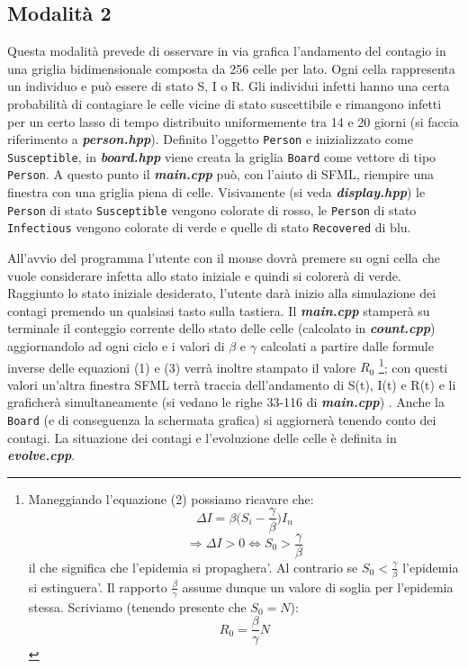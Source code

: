 \documentclass[a4paper,10 pt]{article}
\begin{document}
\subsection{Modalità 2}
Questa modalità prevede di osservare in via grafica l'andamento del contagio in una griglia bidimensionale composta da 256 celle per lato. Ogni cella rappresenta un individuo e può essere di stato S, I o R. Gli individui infetti hanno una certa probabilità di contagiare le celle vicine di stato suscettibile e rimangono infetti per un certo lasso di tempo distribuito uniformemente tra 14 e 20 giorni (si faccia riferimento a \textbf{\textit{person.hpp}}). Definito l'oggetto \verb!Person! e inizializzato come \verb!Susceptible!, in \textbf{\textit{board.hpp}} viene creata la griglia \verb!Board! come vettore di tipo  \verb!Person!. A questo punto il \textbf{\textit{main.cpp}} può, con l'aiuto di SFML, riempire una finestra con una griglia piena di celle. Visivamente (si veda  \textbf{\textit{display.hpp}}) le \verb!Person! di stato \verb!Susceptible! vengono colorate di rosso, le \verb!Person! di stato \verb!Infectious! vengono colorate di verde e quelle di stato \verb!Recovered! di blu.

All'avvio del programma l'utente con il mouse dovrà premere su ogni cella che vuole considerare infetta allo stato iniziale e quindi si colorerà di verde. Raggiunto lo stato iniziale desiderato, l'utente darà inizio alla simulazione dei contagi premendo un qualsiasi tasto sulla tastiera. Il \textbf{\textit{main.cpp}} stamperà su terminale il conteggio corrente dello stato delle celle (calcolato in \textbf{\textit{count.cpp}}) aggiornandolo ad ogni ciclo e i valori di $\beta$ e $\gamma$ calcolati a partire dalle formule inverse delle equazioni (1) e (3) verrà inoltre stampato il valore $R_0$ 
\footnote{
  Maneggiando l'equazione (2) possiamo ricavare che:
  $$
    \Delta I = \beta \big( S_i - \frac{\gamma}{\beta} \big) I_n
  $$
  $$
    \Rightarrow \Delta I > 0 \Leftrightarrow S_0 > \frac{\gamma}{\beta}
  $$ il che significa che l'epidemia si propaghera'. Al contrario se $S_0 < \frac{\gamma}{\beta}$
  l'epidemia si estinguera'. Il rapporto $\frac{\beta}{\gamma}$ assume dunque un valore di soglia per l'epidemia
  stessa. Scriviamo (tenendo presente che $S_0 = N$):
  $$
    R_0 = \frac{\beta}{\gamma} N 
  $$
}; con questi valori un'altra finestra SFML terrà traccia dell'andamento di S(t), I(t) e R(t) e li graficherà simultaneamente (si vedano le righe 33-116 di \textbf{\textit{main.cpp}}) . Anche la \verb!Board! (e di conseguenza la schermata grafica) si aggiornerà tenendo conto dei contagi. La situazione dei contagi e l'evoluzione delle celle è definita in \textbf{\textit{evolve.cpp}}.
\end{document}

